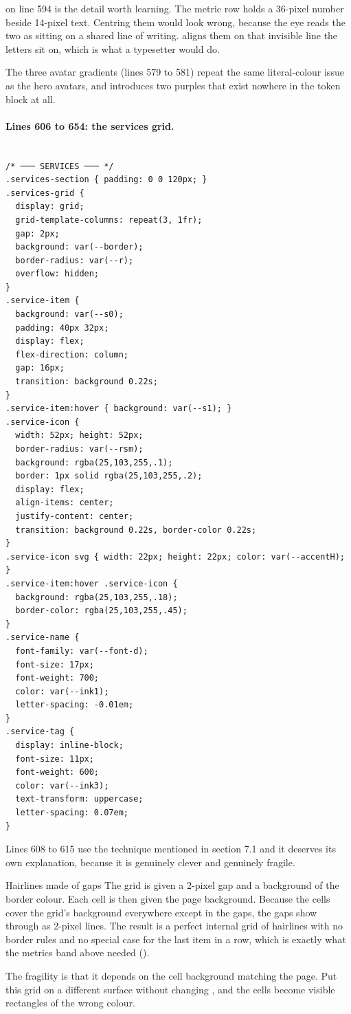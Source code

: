  on line 594 is the detail worth learning. The metric
row holds a 36-pixel number beside 14-pixel text. Centring them would look wrong,
because the eye reads the two as sitting on a shared line of writing.
 aligns them on that invisible line the letters sit on, which is
what a typesetter would do.

The three avatar gradients (lines 579 to 581) repeat the same literal-colour issue
as the hero avatars, and  introduces two purples that exist nowhere in
the token block at all.

\paragraph{Lines 606 to 654: the services grid.}

\begin{lstlisting}[firstnumber=605,caption={\file{css/site.css}, lines 605--654}]

/* ─── SERVICES ─── */
.services-section { padding: 0 0 120px; }
.services-grid {
  display: grid;
  grid-template-columns: repeat(3, 1fr);
  gap: 2px;
  background: var(--border);
  border-radius: var(--r);
  overflow: hidden;
}
.service-item {
  background: var(--s0);
  padding: 40px 32px;
  display: flex;
  flex-direction: column;
  gap: 16px;
  transition: background 0.22s;
}
.service-item:hover { background: var(--s1); }
.service-icon {
  width: 52px; height: 52px;
  border-radius: var(--rsm);
  background: rgba(25,103,255,.1);
  border: 1px solid rgba(25,103,255,.2);
  display: flex;
  align-items: center;
  justify-content: center;
  transition: background 0.22s, border-color 0.22s;
}
.service-icon svg { width: 22px; height: 22px; color: var(--accentH); }
.service-item:hover .service-icon {
  background: rgba(25,103,255,.18);
  border-color: rgba(25,103,255,.45);
}
.service-name {
  font-family: var(--font-d);
  font-size: 17px;
  font-weight: 700;
  color: var(--ink1);
  letter-spacing: -0.01em;
}
.service-tag {
  display: inline-block;
  font-size: 11px;
  font-weight: 600;
  color: var(--ink3);
  text-transform: uppercase;
  letter-spacing: 0.07em;
}
\end{lstlisting}

Lines 608 to 615 use the technique mentioned in section 7.1 and it deserves its own
explanation, because it is genuinely clever and genuinely fragile.

\begin{keyidea}{Hairlines made of gaps}
The grid is given a 2-pixel gap and a background of the border colour. Each cell is
then given the page background. Because the cells cover the grid's background
everywhere except in the gaps, the gaps show through as 2-pixel lines. The result
is a perfect internal grid of hairlines with no border rules and no special case
for the last item in a row, which is exactly what the metrics band above needed
().

The fragility is that it depends on the cell background matching the page. Put this
grid on a different surface without changing , and the cells
become visible rectangles of the wrong colour.
\end{keyidea}

